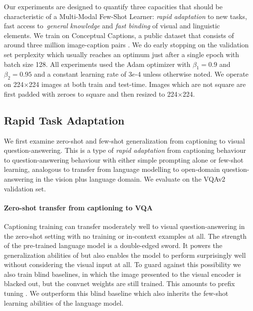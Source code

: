 Our experiments are designed to quantify three capacities that should be characteristic of a Multi-Modal Few-Shot Learner: \emph{rapid adaptation} to new tasks, fast access to~\emph{general knowledge} and \emph{fast binding} of visual and linguistic elements. We train \Model on Conceptual Captions, a public dataset that consists of around three million image-caption pairs \cite{sharma2018conceptual}. We do early stopping on the validation set perplexity which usually reaches an optimum just after a single epoch with batch size 128. All experiments used the Adam optimizer with $\beta_1 = 0.9$ and $\beta_2 = 0.95$ and a constant learning rate of $3e\text{-}4$ unless otherwise noted. We operate on 224$\times$224 images at both train and test-time. Images which are not square are first padded with zeroes to square and then resized to 224$\times$224.

\subsection{Rapid Task Adaptation}
\label{sec:rapid_adaptation}

We first examine zero-shot and few-shot generalization from captioning to visual question-answering. This is a type of \emph{rapid adaptation} from captioning behaviour to question-answering behaviour with either simple prompting alone or few-shot learning, analogous to transfer from language modelling to open-domain question-answering \cite{roberts2020much} in the vision plus language domain. We evaluate on the VQAv2 \cite{goyal2017making} validation set.

\paragraph{Zero-shot transfer from captioning to VQA}

Captioning training can transfer moderately well to visual question-answering in the zero-shot setting with no training or in-context examples at all. The strength of the pre-trained language model is a double-edged sword. It powers the generalization abilities of \Model but also enables the model to perform surprisingly well without considering the visual input at all. To guard against this possibility we also train blind baselines, in which the image presented to the visual encoder is blacked out, but the convnet weights are still trained. This amounts to prefix tuning \cite{li2021prefix}. We outperform this blind baseline which also inherits the few-shot learning abilities of the language model.

